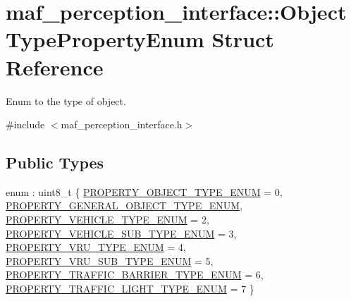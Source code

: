 \hypertarget{structmaf__perception__interface_1_1ObjectTypePropertyEnum}{}\section{maf\+\_\+perception\+\_\+interface\+:\+:Object\+Type\+Property\+Enum Struct Reference}
\label{structmaf__perception__interface_1_1ObjectTypePropertyEnum}


Enum to the type of object.  




{\ttfamily \#include $<$maf\+\_\+perception\+\_\+interface.\+h$>$}

\subsection*{Public Types}
\begin{DoxyCompactItemize}
\item 
enum \+: uint8\+\_\+t \{ \newline
\hyperlink{structmaf__perception__interface_1_1ObjectTypePropertyEnum_af86073a70f72918c764ad4330f2c4739ac69c6d3ee550a52a661bef93f9e42261}{P\+R\+O\+P\+E\+R\+T\+Y\+\_\+\+O\+B\+J\+E\+C\+T\+\_\+\+T\+Y\+P\+E\+\_\+\+E\+N\+UM} = 0, 
\hyperlink{structmaf__perception__interface_1_1ObjectTypePropertyEnum_af86073a70f72918c764ad4330f2c4739afe103fb214e0f0da9c48f32408384a42}{P\+R\+O\+P\+E\+R\+T\+Y\+\_\+\+G\+E\+N\+E\+R\+A\+L\+\_\+\+O\+B\+J\+E\+C\+T\+\_\+\+T\+Y\+P\+E\+\_\+\+E\+N\+UM}, 
\hyperlink{structmaf__perception__interface_1_1ObjectTypePropertyEnum_af86073a70f72918c764ad4330f2c4739a159e2a6cb25c790b3b90059aa69e8ca6}{P\+R\+O\+P\+E\+R\+T\+Y\+\_\+\+V\+E\+H\+I\+C\+L\+E\+\_\+\+T\+Y\+P\+E\+\_\+\+E\+N\+UM} = 2, 
\hyperlink{structmaf__perception__interface_1_1ObjectTypePropertyEnum_af86073a70f72918c764ad4330f2c4739aa970cab09c4bc4cae599db83c9053b2d}{P\+R\+O\+P\+E\+R\+T\+Y\+\_\+\+V\+E\+H\+I\+C\+L\+E\+\_\+\+S\+U\+B\+\_\+\+T\+Y\+P\+E\+\_\+\+E\+N\+UM} = 3, 
\newline
\hyperlink{structmaf__perception__interface_1_1ObjectTypePropertyEnum_af86073a70f72918c764ad4330f2c4739a27a2fe8d69166c0e0e9f0dcc9b11e055}{P\+R\+O\+P\+E\+R\+T\+Y\+\_\+\+V\+R\+U\+\_\+\+T\+Y\+P\+E\+\_\+\+E\+N\+UM} = 4, 
\hyperlink{structmaf__perception__interface_1_1ObjectTypePropertyEnum_af86073a70f72918c764ad4330f2c4739ae70669e74efe7befdb7f842850cbb195}{P\+R\+O\+P\+E\+R\+T\+Y\+\_\+\+V\+R\+U\+\_\+\+S\+U\+B\+\_\+\+T\+Y\+P\+E\+\_\+\+E\+N\+UM} = 5, 
\hyperlink{structmaf__perception__interface_1_1ObjectTypePropertyEnum_af86073a70f72918c764ad4330f2c4739a88eab81d4abfa17eb4f0946f394ff29e}{P\+R\+O\+P\+E\+R\+T\+Y\+\_\+\+T\+R\+A\+F\+F\+I\+C\+\_\+\+B\+A\+R\+R\+I\+E\+R\+\_\+\+T\+Y\+P\+E\+\_\+\+E\+N\+UM} = 6, 
\hyperlink{structmaf__perception__interface_1_1ObjectTypePropertyEnum_af86073a70f72918c764ad4330f2c4739ab4e66001bd8169b6ba06f61cb1c2f074}{P\+R\+O\+P\+E\+R\+T\+Y\+\_\+\+T\+R\+A\+F\+F\+I\+C\+\_\+\+L\+I\+G\+H\+T\+\_\+\+T\+Y\+P\+E\+\_\+\+E\+N\+UM} = 7
 \}
\end{DoxyCompactItemize}
